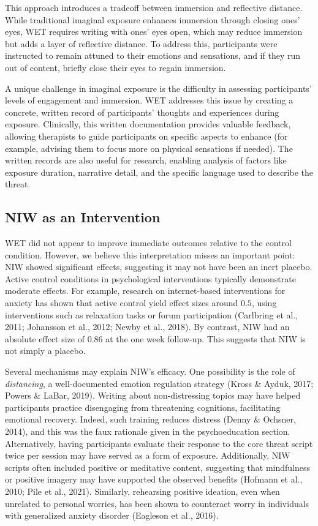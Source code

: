 \documentclass[
  man,floatsintext]{apa7}
\begin{document}
This approach introduces a tradeoff between immersion and reflective distance.
While traditional imaginal exposure enhances immersion through closing ones' eyes, WET requires writing with ones' eyes open, which may reduce immersion but adds a layer of reflective distance.
To address this, participants were instructed to remain attuned to their emotions and sensations, and if they run out of content, briefly close their eyes to regain immersion.

A unique challenge in imaginal exposure is the difficulty in assessing participants' levels of engagement and immersion.
WET addresses this issue by creating a concrete, written record of participants' thoughts and experiences during exposure.
Clinically, this written documentation provides valuable feedback, allowing therapists to guide participants on specific aspects to enhance (for example, advising them to focus more on physical sensations if needed).
The written records are also useful for research, enabling analysis of factors like exposure duration, narrative detail, and the specific language used to describe the threat.

\subsection{NIW as an Intervention}\label{niw-as-an-intervention}

WET did not appear to improve immediate outcomes relative to the control condition.
However, we believe this interpretation misses an important point: NIW showed significant effects, suggesting it may not have been an inert placebo.
Active control conditions in psychological interventions typically demonstrate moderate effects.
For example, research on internet-based interventions for anxiety has shown that active control yield effect sizes around \(0.5\), using interventions such as relaxation tasks or forum participation (Carlbring et al., 2011; Johansson et al., 2012; Newby et al., 2018).
By contrast, NIW had an absolute effect size of \(0.86\) at the one week follow-up.
This suggests that NIW is not simply a placebo.

Several mechanisms may explain NIW's efficacy.
One possibility is the role of \emph{distancing}, a well-documented emotion regulation strategy (Kross \& Ayduk, 2017; Powers \& LaBar, 2019).
Writing about non-distressing topics may have helped participants practice disengaging from threatening cognitions, facilitating emotional recovery.
Indeed, such training reduces distress (Denny \& Ochsner, 2014), and this was the faux rationale given in the psychoeducation section.
Alternatively, having participants evaluate their response to the core threat script twice per session may have served as a form of exposure.
Additionally, NIW scripts often included positive or meditative content, suggesting that mindfulness or positive imagery may have supported the observed benefits (Hofmann et al., 2010; Pile et al., 2021).
Similarly, rehearsing positive ideation, even when unrelated to personal worries, has been shown to counteract worry in individuals with generalized anxiety disorder (Eagleson et al., 2016).
\end{document}

